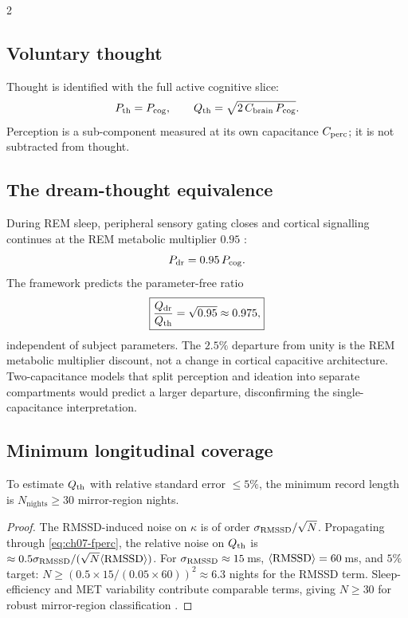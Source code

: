 \begin{multicols}{2}
\subsection{Voluntary thought}

Thought is identified with the full active cognitive slice:
\begin{equation}
  P_{\mathrm{th}} = P_{\mathrm{cog}}, \qquad Q_{\mathrm{th}} = \sqrt{2\,C_{\mathrm{brain}}\,P_{\mathrm{cog}}}.
  \label{eq:ch07-Qth}
\end{equation}
Perception is a sub-component measured at its own capacitance $C_{\mathrm{perc}}$; it
is not subtracted from thought.

\subsection{The dream-thought equivalence}

During REM sleep, peripheral sensory gating closes \citep{llinas1993,
rechtschaffen1968} and cortical signalling continues at the REM metabolic
multiplier $0.95$ \citep{maquet1990,madsen1991}:
\begin{equation}
  P_{\mathrm{dr}} = 0.95\,P_{\mathrm{cog}}.
  \label{eq:ch07-Pdr}
\end{equation}
The framework predicts the parameter-free ratio
\begin{equation}
  \boxed{\frac{Q_{\mathrm{dr}}}{Q_{\mathrm{th}}} = \sqrt{0.95} \approx 0.975,}
  \label{eq:ch07-ratio}
\end{equation}
independent of subject parameters.  The $2.5\%$ departure from unity is the
REM metabolic multiplier discount, not a change in cortical capacitive
architecture.  Two-capacitance models that split perception and ideation into
separate compartments would predict a larger departure, disconfirming the
single-capacitance interpretation.

\subsection{Minimum longitudinal coverage}

\begin{theorem}
\label{thm:ch07-coverage}
To estimate $Q_{\mathrm{th}}$ with relative standard error $\le 5\%$, the minimum
record length is $N_{\mathrm{nights}} \ge 30$ mirror-region nights.
\end{theorem}

\begin{proof}
The RMSSD-induced noise on $\kappa$ is of order $\sigma_{\mathrm{RMSSD}}/\sqrt{N}$.
Propagating through \eqref{eq:ch07-fperc}, the relative noise on $Q_{\mathrm{th}}$ is
$\approx 0.5\sigma_{\mathrm{RMSSD}}/(\sqrt{N}\langle\mathrm{RMSSD}\rangle)$.  For
$\sigma_{\mathrm{RMSSD}} \approx 15$\,ms, $\langle\mathrm{RMSSD}\rangle = 60$\,ms, and $5\%$
target: $N \ge (0.5\times15/(0.05\times60))^2 \approx 6.3$ nights for the
RMSSD term.  Sleep-efficiency and MET variability contribute comparable
terms, giving $N \ge 30$ for robust mirror-region classification
\citep{shaffer2017}.
\end{proof}

\end{multicols}

